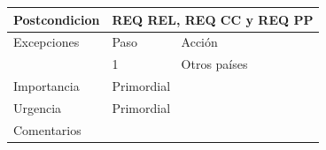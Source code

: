 \begin{table}[th!]
\begin{tabular}{|l|l|l|}
		Postcondicion                                                                & \multicolumn{2}{l|}{REQ REL, REQ CC y  REQ PP}                                                                                                                                                      \\ \hline
		Excepciones                                                                  & Paso                         & Acción                                                                                                                                                      \\ \hline
		& 1                            & Otros países                                                                                                                                                \\ \hline
		Importancia                                                                  & \multicolumn{2}{l|}{Primordial}                                                                                                                                                            \\ \hline
		Urgencia                                                                     & \multicolumn{2}{l|}{Primordial}                                                                                                                                                            \\ \hline
		Comentarios                                                                  & \multicolumn{2}{l|}{}                                                                                                                                                                      \\ \hline
	\end{tabular}
\end{table}


